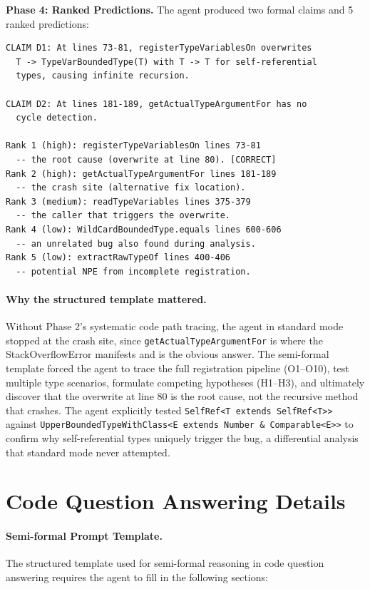 \documentclass[]{meta}
\begin{document}
\textbf{Phase 4: Ranked Predictions.} The agent produced two formal claims and 5 ranked predictions:

\begin{tcolorbox}[colback=gray!5, colframe=gray!50, boxrule=0.3pt, breakable]
\small
\begin{verbatim}
CLAIM D1: At lines 73-81, registerTypeVariablesOn overwrites
  T -> TypeVarBoundedType(T) with T -> T for self-referential
  types, causing infinite recursion.

CLAIM D2: At lines 181-189, getActualTypeArgumentFor has no
  cycle detection.

Rank 1 (high): registerTypeVariablesOn lines 73-81
  -- the root cause (overwrite at line 80). [CORRECT]
Rank 2 (high): getActualTypeArgumentFor lines 181-189
  -- the crash site (alternative fix location).
Rank 3 (medium): readTypeVariables lines 375-379
  -- the caller that triggers the overwrite.
Rank 4 (low): WildCardBoundedType.equals lines 600-606
  -- an unrelated bug also found during analysis.
Rank 5 (low): extractRawTypeOf lines 400-406
  -- potential NPE from incomplete registration.
\end{verbatim}
\end{tcolorbox}

\paragraph{Why the structured template mattered.}
Without Phase 2's systematic code path tracing, the agent in standard mode stopped at the crash site, since \texttt{getActualTypeArgumentFor} is where the StackOverflowError manifests and is the obvious answer.
The semi-formal template forced the agent to trace the full registration pipeline (O1--O10), test multiple type scenarios, formulate competing hypotheses (H1--H3), and ultimately discover that the overwrite at line 80 is the root cause, not the recursive method that crashes.
The agent explicitly tested \texttt{SelfRef<T extends SelfRef<T>{}>} against \texttt{UpperBoundedTypeWithClass<E extends Number \& Comparable<E>{}>} to confirm why self-referential types uniquely trigger the bug, a differential analysis that standard mode never attempted.


\section{Code Question Answering Details}
\label{app:rubber-duck}

\paragraph{Semi-formal Prompt Template.}
The structured template used for semi-formal reasoning in code question answering requires the agent to fill in the following sections:
\end{document}
